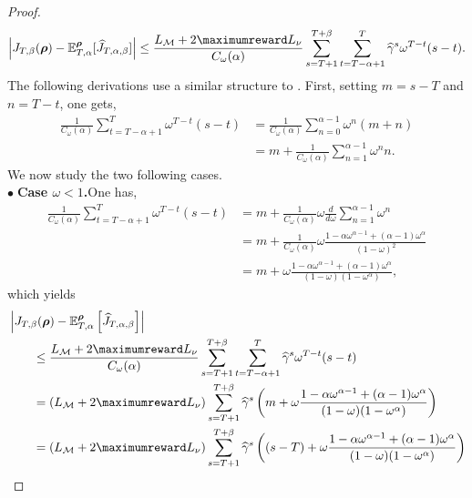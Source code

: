 \begin{proof}
\begin{align*}
    \left\vert J_{T,\beta}(\boldsymbol\rho) - \mathbb{E}^{\boldsymbol\rho}_{T,\alpha}[\widehat{J}_{T,\alpha,\beta}] \right\vert \le \frac{L_{\mathcal{M}} + 2\maximumreward L_\nu}{C_\omega(\alpha)} \sum_{s=T+1}^{T+\beta} \sum_{t=T-\alpha+1}^{T} \widehat{\gamma}^s    \omega^{T-t} (s-t).
\end{align*}
The following derivations use a similar structure to \cite[Lemma~3.4]{jagerman2019people}. 
First, setting $m = s-T$ and $n=T-t$, one gets,
\begin{align}
    \frac{1}{C_\omega(\alpha)}\sum_{t=T-\alpha+1}^{T} \omega^{T-t} (s-t)
    &=  \frac{1}{C_\omega(\alpha)}\sum_{n=0}^{\alpha-1} \omega^{n} (m+n) \nonumber\\
    &= m + \frac{1}{C_\omega(\alpha)}
    \sum_{n=1}^{\alpha-1} \omega^{n} n.\label{eq:sum_m_n}
\end{align}
We now study the two following cases. \\
\noindent$\bullet\;$\textbf{Case $\omega<1$.}\indent One has,
\begin{align*}
    \frac{1}{C_\omega(\alpha)}\sum_{t=T-\alpha+1}^{T} \omega^{T-t} (s-t)
    &= m + \frac{1}{C_\omega(\alpha)} \omega \frac{d}{d\omega}
    \sum_{n=1}^{\alpha-1} \omega^{n} 
    \\
    &= m + \frac{1}{C_\omega(\alpha)} \omega 
    \frac{1-\alpha\omega^{\alpha-1} + (\alpha-1) \omega^\alpha}{(1-\omega)^2}
    \\
    &= m + \omega 
    \frac{1-\alpha\omega^{\alpha-1} + (\alpha-1) \omega^\alpha}{(1-\omega)(1-\omega^\alpha)},
\end{align*}
which yields
\begin{align*}
    &\left|J_{T,\beta}(\boldsymbol\rho) - \mathbb{E}^{\boldsymbol\rho}_{T,\alpha}\left[\widehat{J}_{T,\alpha,\beta}\right] \right| 
    \\
    &\qquad \le \frac{L_{\mathcal{M}} + 2\maximumreward L_\nu}{C_\omega(\alpha)} \sum_{s=T+1}^{T+\beta} \sum_{t=T-\alpha+1}^{T} \widehat{\gamma}^s    \omega^{T-t} (s-t) 
    \\
    &\qquad= \left(L_{\mathcal{M}} + 2\maximumreward L_\nu\right) \sum_{s=T+1}^{T+\beta} \widehat{\gamma}^s \left(m + \omega 
    \frac{1-\alpha\omega^{\alpha-1} + (\alpha-1) \omega^\alpha}{(1-\omega)(1-\omega^\alpha)}\right)
    \\
    &\qquad= \left(L_{\mathcal{M}} + 2\maximumreward L_\nu\right) \sum_{s=T+1}^{T+\beta} \widehat{\gamma}^s \left((s-T) + \omega 
    \frac{1-\alpha\omega^{\alpha-1} + (\alpha-1) \omega^\alpha}{(1-\omega)(1-\omega^\alpha)}\right)

\end{align*}
\end{proof}
